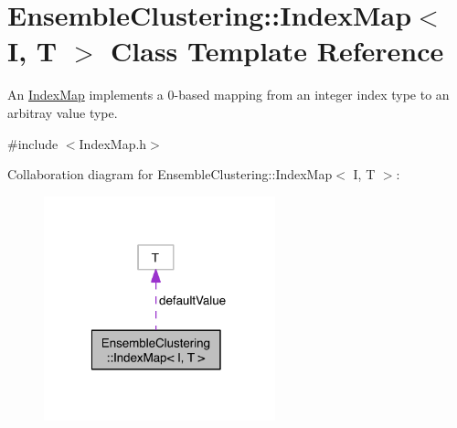 \hypertarget{class_ensemble_clustering_1_1_index_map}{\section{Ensemble\-Clustering\-:\-:Index\-Map$<$ I, T $>$ Class Template Reference}
\label{class_ensemble_clustering_1_1_index_map}
}


An \hyperlink{class_ensemble_clustering_1_1_index_map}{Index\-Map} implements a 0-\/based mapping from an integer index type to an arbitray value type.  




{\ttfamily \#include $<$Index\-Map.\-h$>$}



Collaboration diagram for Ensemble\-Clustering\-:\-:Index\-Map$<$ I, T $>$\-:\nopagebreak
\begin{figure}[H]
\begin{center}
\leavevmode
\includegraphics[width=190pt]{class_ensemble_clustering_1_1_index_map__coll__graph}
\end{center}
\end{figure}

